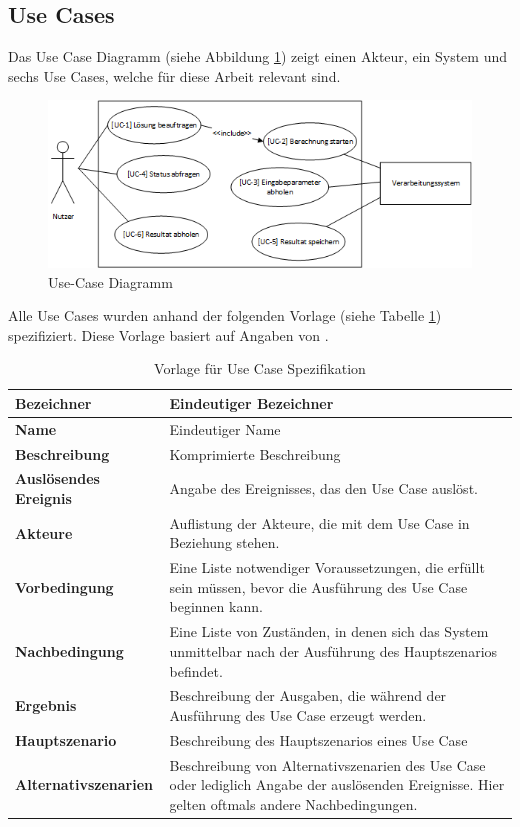 \subsection{Use Cases}\label{use_cases}
Das Use Case Diagramm (siehe Abbildung \ref{fig:use_case}) zeigt einen Akteur, ein System und sechs Use Cases, welche für diese Arbeit relevant sind.
\begin{figure}[h]
\includegraphics{images/anforderungen/use_cases.png}
\caption[Use-Case Diagramm]{Use-Case Diagramm \selfmade{}}
\label{fig:use_case}
\end{figure}

Alle Use Cases wurden anhand der folgenden Vorlage (siehe Tabelle \ref{table:use_case_template}) spezifiziert. Diese Vorlage basiert auf Angaben von \cite{req_eng_book}.

\begin{table}[ht]
\centering
  \begin{tabular}{ l | p{10cm} }
	\hline
	\rowcolor{gray}
	\textbf{Bezeichner}&	\textbf{Eindeutiger Bezeichner}\\ \hline
	\textbf{Name}		&	Eindeutiger Name\\ \hline
	\textbf{Beschreibung}	&	Komprimierte Beschreibung\\ \hline
	\textbf{Auslösendes Ereignis} &	Angabe des Ereignisses, das den Use Case auslöst.\\ \hline
	\textbf{Akteure}		&	Auflistung der Akteure, die mit dem Use Case in Beziehung stehen.\\ \hline
	\textbf{Vorbedingung}	&	Eine Liste notwendiger Voraussetzungen, die erfüllt sein müssen, bevor die Ausführung des Use Case beginnen kann.\\ \hline
	\textbf{Nachbedingung}	&	Eine Liste von Zuständen, in denen sich das System unmittelbar nach der Ausführung des Hauptszenarios befindet.\\ \hline
	\textbf{Ergebnis}		&	Beschreibung der Ausgaben, die während der Ausführung des Use Case erzeugt werden.\\ \hline
	\textbf{Hauptszenario}	&	Beschreibung des Hauptszenarios eines Use Case\\ \hline
	\textbf{Alternativszenarien}	&	Beschreibung von Alternativszenarien des Use Case oder lediglich Angabe der auslösenden Ereignisse. 
					Hier gelten oftmals andere Nachbedingungen.\\ \hline
  \end{tabular}
   \caption{Vorlage für Use Case Spezifikation}\label{table:use_case_template}
\end{table}


